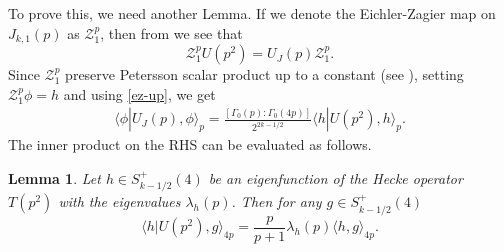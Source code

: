 \documentclass[11pt]{amsart}
\numberwithin{equation}{section}
\theoremstyle{plain}
\newtheorem{lem}[thm]{Lemma}
\theoremstyle{definition}
\newcommand{\mc}{\mathcal}
\newcommand{\lan}{\langle }
\newcommand{\ran}{\rangle}
\begin{document}
To prove this, we need another Lemma.
If we denote the Eichler-Zagier map on $J_{k,1}(p)$ as $\mc Z_1^p$, then from \cite[Proposition 7]{manickam1993saito} we see that 
\begin{equation} \label{ez-up}
  \mc Z_1^p U(p^2)= U_J(p)\mc Z_1^p .
\end{equation}
 Since $\mc Z_1^p$ preserve Petersson scalar product up to a constant (see \cite{Ag-Br}), setting $\mc Z_1^p\phi=h$ and using \eqref{ez-up}, we get
\begin{align} \label{ujp-up2}
\lan\phi|U_J(p), \phi\ran_p = \frac{[\Gamma_0(p):\Gamma_0(4p)]}{2^{2k-1/2}}\lan h|U(p^2), h\ran_p.    
\end{align}
The inner product on the RHS can be evaluated as follows.
\begin{lem}\label{halfnorm}
    Let $h\in S_{k-1/2}^+(4)$ be an eigenfunction of the Hecke operator $T(p^2)$ with the eigenvalues $\lambda_h(p)$. Then for any $g\in S_{k-1/2}^+(4)$
    \begin{equation}\label{hUp2norm}
    \langle h|U(p^2), g \rangle_{4p} = \frac{p}{p+1}\lambda_h(p) \langle  h, g\rangle_{4p}.
\end{equation}
\end{lem}
\end{document}
